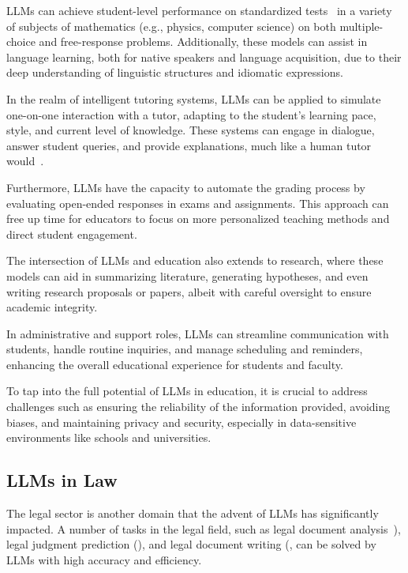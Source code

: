 LLMs can achieve student-level performance on standardized tests~\cite{openai2024gpt4} in a variety of subjects of mathematics (e.g., physics, computer science) on both multiple-choice and free-response problems.
Additionally, these models can assist in language learning, both for native speakers and language acquisition, due to their deep understanding of linguistic structures and idiomatic expressions.

In the realm of intelligent tutoring systems, LLMs can be applied to simulate one-on-one interaction with a tutor, adapting to the student's learning pace, style, and current level of knowledge.
These systems can engage in dialogue, answer student queries, and provide explanations, much like a human tutor would~\cite{malinka2023educationalimpact,susnjak2022chatgpt}.

Furthermore, LLMs have the capacity to automate the grading process by evaluating open-ended responses in exams and assignments.
This approach can free up time for educators to focus on more personalized teaching methods and direct student engagement.

The intersection of LLMs and education also extends to research, where these models can aid in summarizing literature, generating hypotheses, and even writing research proposals or papers, albeit with careful oversight to ensure academic integrity.

In administrative and support roles, LLMs can streamline communication with students, handle routine inquiries, and manage scheduling and reminders, enhancing the overall educational experience for students and faculty.

To tap into the full potential of LLMs in education, it is crucial to address challenges such as ensuring the reliability of the information provided, avoiding biases, and maintaining privacy and security, especially in data-sensitive environments like schools and universities.

\subsection{LLMs in Law}
\label{subsec:llms-in-law}


The legal sector is another domain that the advent of LLMs has significantly impacted.
A number of tasks in the legal field, such as legal document analysis~\cite{blairstanek2023gpt3statutory}), legal judgment prediction (\textcite{trautmann2022legalprompt}), and legal document writing (\textcite{choi2023chatgptlaw}, can be solved by LLMs with high accuracy and efficiency.

